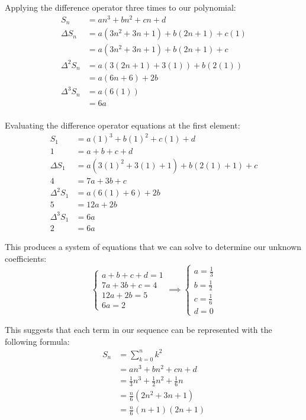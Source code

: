 \documentclass{article}
\begin{document}
Applying the difference operator three times to our polynomial:
\[\begin{aligned}
    S_n &= an^3+bn^2+cn+d \\
    \Delta S_n &= a(3n^2+3n+1)+b(2n+1)+c(1) \\
    &= a(3n^2+3n+1)+b(2n+1)+c \\
    \Delta^2 S_n &= a(3(2n+1)+3(1))+b(2(1)) \\
    &= a(6n+6) + 2b \\
    \Delta^3 S_n &= a(6(1)) \\
    &= 6a \\
\end{aligned}\]

Evaluating the difference operator equations at the first element:
\[\begin{aligned}
    S_1 &= a(1)^3+b(1)^2+c(1)+d \\
    1 &= a + b + c + d \\
    \Delta S_1 &= a(3(1)^2+3(1)+1)+b(2(1)+1)+c \\
    4 &= 7a + 3b + c \\
    \Delta^2 S_1 &= a(6(1)+6) + 2b \\
    5 &= 12a + 2b \\
    \Delta^3 S_1 &= 6a \\
    2 &= 6a
\end{aligned}\]

This produces a system of equations that we can solve to determine our unknown coefficients:
\[\begin{cases}
    a + b + c + d = 1 \\
    7a + 3b + c = 4 \\
    12a + 2b = 5 \\
    6a = 2
\end{cases}
\implies
\begin{cases}
    a = \frac{1}{3} \\
    b = \frac{1}{2} \\
    c = \frac{1}{6} \\
    d = 0
\end{cases}\]

This suggests that each term in our sequence can be represented with the following formula:
\[\begin{aligned}
    S_n &= \sum_{k=0}^{n}k^2 \\
    &= an^3 + bn^2 + cn + d\\
    &= \frac{1}{3}n^3 + \frac{1}{2}n^2 + \frac{1}{6}n \\
    &= \frac{n}{6}(2n^2+3n+1) \\
    &= \frac{n}{6}(n+1)(2n+1)
\end{aligned}\]
\end{document}
